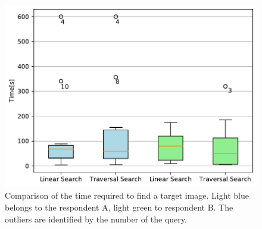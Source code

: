 \begin{figure}
    \centering
    \includegraphics[width=0.7\linewidth]{graphs/face_search_time.pdf}
    \caption{Comparison of the time required to find a target image. Light blue belongs to the respondent A, light green to respondent B. The outliers are identified by the number of the query.}
    \label{fig:my_label}
\end{figure}
